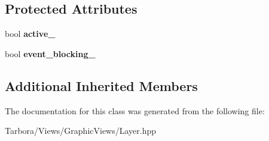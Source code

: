 \subsection*{Protected Attributes}
\begin{DoxyCompactItemize}
\item 
\mbox{\label{classTarbora_1_1Layer_a4d7fdc234d3b929bff31b80013355ddb}} 
bool {\bfseries active\+\_\+}
\item 
\mbox{\label{classTarbora_1_1Layer_a0c24802fe48c762c865fea4fa6357e04}} 
bool {\bfseries event\+\_\+blocking\+\_\+}
\end{DoxyCompactItemize}
\subsection*{Additional Inherited Members}


The documentation for this class was generated from the following file\+:\begin{DoxyCompactItemize}
\item 
Tarbora/\+Views/\+Graphic\+Views/Layer.\+hpp\end{DoxyCompactItemize}

